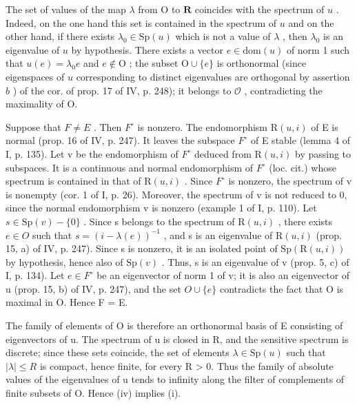 The set of values of the map \(\lambda\) from O to \(\mathbf{R}\) coincides with the spectrum of \(u\) . Indeed, on the one hand this set is contained in the spectrum of \(u\) and on the other hand, if there exists \(\lambda_0 \in \mathrm{Sp}(u)\) which is not a value of \(\lambda\) , then \(\lambda_0\) is an eigenvalue of \(u\) by hypothesis. There exists a vector \(e \in \mathrm{dom}(u)\) of norm 1 such that \(u(e) = \lambda_0 e\) and \(e \notin \mathrm{O}\) ; the subset \(\mathrm{O} \cup \{e\}\) is orthonormal (since eigenspaces of \(u\) corresponding to distinct eigenvalues are orthogonal by assertion \(b\) ) of the cor. of prop. 17 of IV, p. 248); it belongs to \(\mathcal{O}\) , contradicting the maximality of O.

Suppose that \(F \neq E\) . Then \(F^{\circ}\) is nonzero. The endomorphism \(\mathrm{R}(u,i)\) of E is normal (prop. 16 of IV, p. 247). It leaves the subspace \(F^{\circ}\) of E stable (lemma 4 of I, p. 135). Let v be the endomorphism of \(F^{\circ}\) deduced from \(\mathrm{R}(u,i)\) by passing to subspaces. It is a continuous and normal endomorphism of \(F^{\circ}\) (loc. cit.) whose spectrum is contained in that of \(\mathrm{R}(u,i)\) . Since \(F^{\circ}\) is nonzero, the spectrum of v is nonempty (cor. 1 of I, p. 26). Moreover, the spectrum of v is not reduced to 0, since the normal endomorphism v is nonzero (example 1 of I, p. 110). Let \(s \in \mathrm{Sp}(v) - \{0\}\) . Since s belongs to the spectrum of \(\mathrm{R}(u,i)\) , there exists \(e \in O\) such that \(s = (i - \lambda(e))^{-1}\) , and s is an eigenvalue of \(\mathrm{R}(u,i)\) (prop. 15, a) of IV, p. 247). Since s is nonzero, it is an isolated point of \(\mathrm{Sp}(\mathrm{R}(u,i))\) by hypothesis, hence also of \(\mathrm{Sp}(v)\) . Thus, s is an eigenvalue of v (prop. 5, c) of I, p. 134). Let \(e \in F^{\circ}\) be an eigenvector of norm 1 of v; it is also an eigenvector of u (prop. 15, b) of IV, p. 247), and the set \(O \cup \{e\}\) contradicts the fact that O is maximal in O. Hence F = E.

The family of elements of O is therefore an orthonormal basis of E consisting of eigenvectors of u. The spectrum of u is closed in R, and the sensitive spectrum is discrete; since these sets coincide, the set of elements \(\lambda \in \mathrm{Sp}(u)\) such that \(|\lambda| \leqslant R\) is compact, hence finite, for every R > 0. Thus the family of absolute values of the eigenvalues of u tends to infinity along the filter of complements of finite subsets of O. Hence (iv) implies (i).

